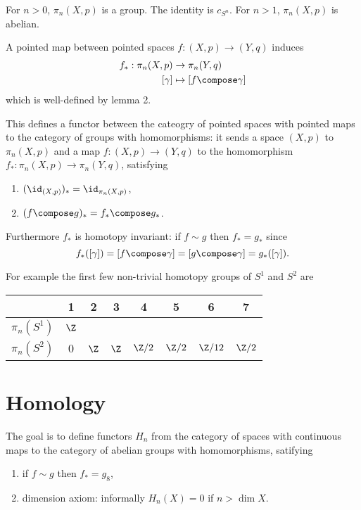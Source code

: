 \documentclass[a4paper]{article}
\begin{document}
For \(n > 0\), \(\pi_n(X, p)\) is a group. The identity is \(c_{S^n}\). For \(n > 1\), \(\pi_n(X, p)\) is abelian.

A pointed map between pointed spaces \(f: (X, p) \to (Y, q)\) induces
\begin{align*}
  f_*: \pi_n(X, p) &\to \pi_n(Y, q) \\
  [\gamma] &\mapsto [f \compose \gamma]
\end{align*}
which is well-defined by lemma 2.

This defines a functor between the cateogry of pointed spaces with pointed maps to the category of groups with homomorphisms: it sends a space \((X, p)\) to \(\pi_n(X, p)\) and a map \(f: (X, p) \to (Y, q)\) to the homomorphism \(f_*: \pi_n(X, p) \to \pi_n(Y, q)\), satisfying
\begin{enumerate}
\item \((\id_{(X, p)})_* = \id_{\pi_n(X, p)}\),
\item \((f \compose g)_* = f_* \compose g_*\).
\end{enumerate}
Furthermore \(f_*\) is homotopy invariant: if \(f \sim g\) then \(f_* = g_*\) since
\[
  f_*([\gamma]) = [f \compose \gamma] = [g \compose \gamma] = g_*([\gamma]).
\]

For example the first few non-trivial homotopy groups of \(S^1\) and \(S^2\) are
\begin{table}[h]
  \centering
  \begin{tabular}{c|c|c|c|c|c|c|c}
    & 1 & 2 & 3 & 4 & 5 & 6 & 7 \\ \hline
    \(\pi_n(S^1)\) & \(\Z\) &&&&&& \\ \hline
    \(\pi_n(S^2)\) & \(0\) & \(\Z\) & \(\Z\) & \(\Z/2\) & \(\Z/2\) & \(\Z/12\) &\(\Z/2\)
  \end{tabular}
\end{table}

\section{Homology}

The goal is to define functors \(H_n\) from the category of spaces with continuous maps to the category of abelian groups with homomorphisms, satifying
\begin{enumerate}
\item if \(f \sim g\) then \(f_* = g_8\),
\item dimension axiom: informally \(H_n(X) = 0\) if \(n > \dim X\).
\end{enumerate}
\end{document}
